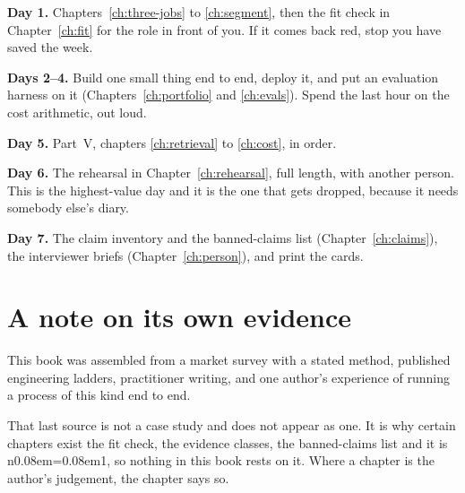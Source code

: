 \begin{kitmethod}
\textbf{Day 1.} Chapters~\ref{ch:three-jobs} to \ref{ch:segment}, then the fit
check in Chapter~\ref{ch:fit} for the role in front of you. If it comes back
red, stop \dash{} you have saved the week.

\textbf{Days 2--4.} Build one small thing end to end, deploy it, and put an
evaluation harness on it (Chapters~\ref{ch:portfolio} and \ref{ch:evals}).
Spend the last hour on the cost arithmetic, out loud.

\textbf{Day 5.} Part~V, chapters \ref{ch:retrieval} to \ref{ch:cost}, in order.

\textbf{Day 6.} The rehearsal in Chapter~\ref{ch:rehearsal}, full length, with
another person. This is the highest-value day and it is the one that gets
dropped, because it needs somebody else's diary.

\textbf{Day 7.} The claim inventory and the banned-claims list
(Chapter~\ref{ch:claims}), the interviewer briefs
(Chapter~\ref{ch:person}), and print the cards.
\end{kitmethod}

\section*{A note on its own evidence}

This book was assembled from a market survey with a stated method, published
engineering ladders, practitioner writing, and one author's experience of
running a process of this kind end to end.

That last source is not a case study and does not appear as one. It is why
certain chapters exist \dash{} the fit check, the evidence classes, the
banned-claims list \dash{} and it is n{\kern0.08em=\kern0.08em}1, so nothing in
this book rests on it. Where a chapter is the author's judgement, the chapter
says so.

\clearpage
